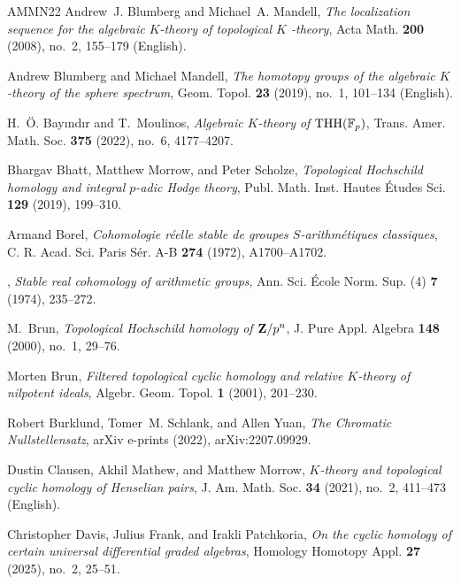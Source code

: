 \documentclass[english,10pt]{amsart}
\theoremstyle{definition}
\numberwithin{equation}{section}
\begin{document}
{\begin{thebibliography}{AMMN22}
Andrew~J. Blumberg and Michael~A. Mandell, \emph{The localization sequence for the algebraic {{\(K\)}}-theory of topological {{\(K\)}} -theory}, Acta Math. \textbf{200} (2008), no.~2, 155--179 (English).

Andrew Blumberg and Michael Mandell, \emph{The homotopy groups of the algebraic {{\(K\)}}-theory of the sphere spectrum}, Geom. Topol. \textbf{23} (2019), no.~1, 101--134 (English).

H.~\"O. Bay{\i}nd{\i}r and T.~Moulinos, \emph{Algebraic {$K$}-theory of {${\rm THH}(\mathbb{F}_p)$}}, Trans. Amer. Math. Soc. \textbf{375} (2022), no.~6, 4177--4207. 

Bhargav Bhatt, Matthew Morrow, and Peter Scholze, \emph{Topological {H}ochschild homology and integral {$p$}-adic {H}odge theory}, Publ. Math. Inst. Hautes \'{E}tudes Sci. \textbf{129} (2019), 199--310. 

Armand Borel, \emph{Cohomologie r\'eelle stable de groupes {$S$}-arithm\'etiques classiques}, C. R. Acad. Sci. Paris S\'er. A-B \textbf{274} (1972), A1700--A1702. 

\bysame, \emph{Stable real cohomology of arithmetic groups}, Ann. Sci. \'Ecole Norm. Sup. (4) \textbf{7} (1974), 235--272. 

M.~Brun, \emph{Topological {H}ochschild homology of {${\bf Z}/p^n$}}, J. Pure Appl. Algebra \textbf{148} (2000), no.~1, 29--76. 

Morten Brun, \emph{Filtered topological cyclic homology and relative {$K$}-theory of nilpotent ideals}, Algebr. Geom. Topol. \textbf{1} (2001), 201--230. 

Robert {Burklund}, Tomer~M. {Schlank}, and Allen {Yuan}, \emph{{The Chromatic Nullstellensatz}}, arXiv e-prints (2022), arXiv:2207.09929.

Dustin Clausen, Akhil Mathew, and Matthew Morrow, \emph{{{\(K\)}}-theory and topological cyclic homology of {Henselian} pairs}, J. Am. Math. Soc. \textbf{34} (2021), no.~2, 411--473 (English).

Christopher Davis, Julius Frank, and Irakli Patchkoria, \emph{On the cyclic homology of certain universal differential graded algebras}, Homology Homotopy Appl. \textbf{27} (2025), no.~2, 25--51. 


\end{thebibliography}}
\end{document}
